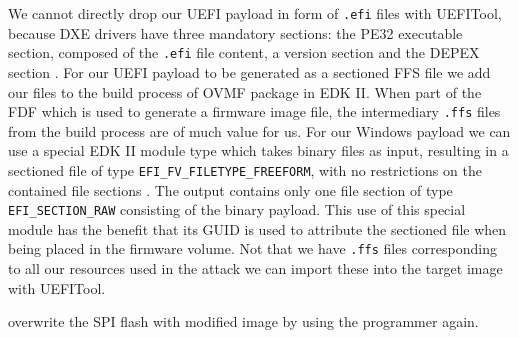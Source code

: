 We cannot directly drop our \ac{UEFI} payload in form of \lstinline{.efi} files with UEFITool, because \ac{DXE} drivers have three mandatory sections: the \ac{PE32} executable section, composed of the \lstinline{.efi} file content, a version section and the \ac{DEPEX} section \cite[Vol. 3, 2.1.4.1.4]{pi-spec}.
For our \ac{UEFI} payload to be generated as a sectioned \ac{FFS} file we add our files to the build process of \ac{OVMF} package in \ac{EDK} II. When part of the \ac{FDF} which is used to generate a firmware image file, the intermediary \lstinline{.ffs} files from the build process are of much value for us.
For our Windows payload we can use a special \ac{EDK} II module type which takes binary files as input, resulting in a sectioned file of type \lstinline{EFI_FV_FILETYPE_FREEFORM}, with no restrictions on the contained file sections \cite[Vol. 3, 2.1.4.1.7]{pi-spec}.
The output contains only one file section of type \lstinline{EFI_SECTION_RAW} consisting of the binary payload.
This use of this special module has the benefit that its \ac{GUID} is used to attribute the sectioned file when being placed in the firmware volume.
Not that we have \lstinline{.ffs} files corresponding to all our resources used in the attack we can import these into the target image with UEFITool.

overwrite the SPI flash with modified image by using the programmer again.

\clearpage
